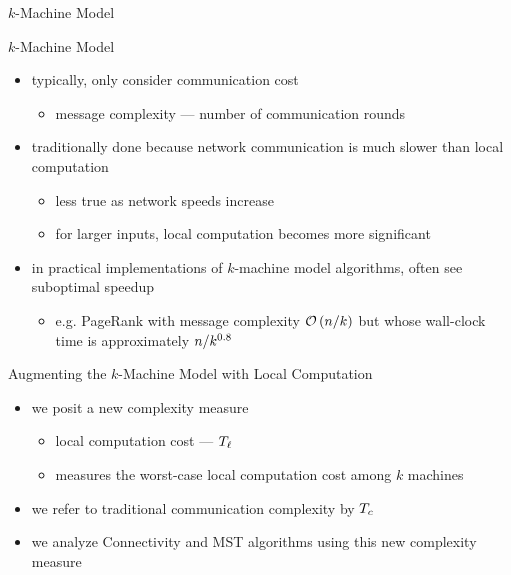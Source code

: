 \begin{frame}{$k$-Machine Model}
{
    }
\end{frame}

\begin{frame}{$k$-Machine Model}
    \begin{itemize}
        \item typically, \alert{only consider communication cost}
              \begin{itemize}
                  \item message complexity --- number of communication rounds
              \end{itemize}
        \item traditionally done because network communication is much slower
              than local computation
              \begin{itemize}
                  \item less true as network speeds increase
                  \item for larger inputs, local computation becomes more significant
              \end{itemize}
        \item in practical implementations of $k$-machine model algorithms,
              often see suboptimal speedup
              \begin{itemize}
                  \item e.g. PageRank with message complexity $\mathcal{O}\left(n / k\right)$ but whose wall-clock
                        time is approximately $n / k^{0.8}$
              \end{itemize}
    \end{itemize}
\end{frame}


\begin{frame}{Augmenting the $k$-Machine Model with Local Computation}
    \begin{itemize}
        \item we posit a new complexity measure
              \begin{itemize}
                  \item \alert{local computation cost} --- $T_{\ell}$
                  \item measures the worst-case local computation cost among $k$ machines
              \end{itemize}
        \item we refer to traditional communication complexity by $T_c$
        \item we analyze Connectivity and MST algorithms using this new complexity measure
    \end{itemize}
\end{frame}

